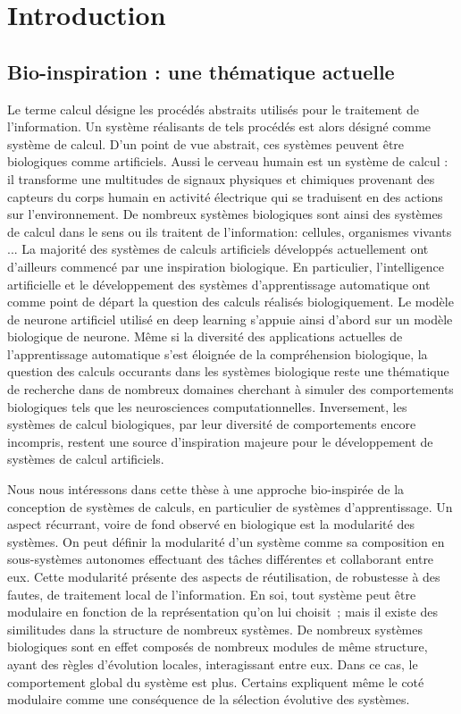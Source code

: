 \section*{Introduction}



\subsection*{Bio-inspiration : une thématique actuelle}

Le terme calcul désigne les procédés abstraits utilisés pour le traitement de l'information. Un système réalisants de tels procédés est alors désigné comme système de calcul. D'un point de vue abstrait, ces systèmes peuvent être biologiques comme artificiels.
Aussi le cerveau humain est un système de calcul : il transforme une multitudes de signaux physiques et chimiques provenant des capteurs du corps humain en activité électrique qui se traduisent en des actions sur l'environnement. De nombreux systèmes biologiques sont ainsi des systèmes de calcul dans le sens ou ils traitent de l'information: cellules, organismes vivants ...
La majorité des systèmes de calculs artificiels développés actuellement ont d'ailleurs commencé par une inspiration biologique. En particulier, l'intelligence artificielle et le développement des systèmes d'apprentissage automatique ont comme point de départ la question des calculs réalisés biologiquement. Le modèle de neurone artificiel utilisé en deep learning s'appuie ainsi d'abord sur un modèle biologique de neurone.
Même si la diversité des applications actuelles de l'apprentissage automatique s'est éloignée de la compréhension biologique, la question des calculs occurants dans les systèmes biologique reste une thématique de recherche dans de nombreux domaines cherchant à simuler des comportements biologiques tels que les neurosciences computationnelles. 
Inversement, les systèmes  de calcul biologiques, par leur diversité de comportements encore incompris, restent une source d'inspiration majeure pour le développement de systèmes de calcul artificiels.

Nous nous intéressons dans cette thèse à une approche bio-inspirée de la conception de systèmes de calculs, en  particulier de systèmes d'apprentissage.
Un aspect récurrant, voire de fond observé en biologique est la modularité des systèmes. On peut définir la modularité d'un système comme sa composition en sous-systèmes autonomes effectuant des tâches différentes et collaborant entre eux. Cette modularité présente des aspects de réutilisation, de robustesse à des fautes, de traitement local de l'information. En soi, tout système peut être modulaire en fonction de la représentation qu'on lui choisit~; mais il existe des similitudes dans la structure de nombreux systèmes. De nombreux systèmes biologiques sont en effet composés de nombreux modules de même structure, ayant des règles d'évolution locales,  interagissant entre eux. Dans ce cas, le comportement global du système est plus.
Certains expliquent même le coté modulaire comme une conséquence de la sélection évolutive des systèmes.

